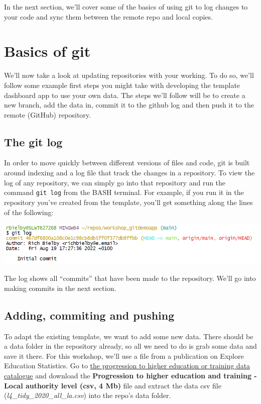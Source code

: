 \documentclass[
  12pt,
]{article}
\begin{document}
In the next section, we'll cover some of the basics of using git to log
changes to your code and sync them between the remote repo and local
copies.

\newpage

\hypertarget{basics-of-git}{%
\section{Basics of git}\label{basics-of-git}}

We'll now take a look at updating repositories with your working. To do
so, we'll follow some example first steps you might take with developing
the template dashboard app to use your own data. The steps we'll follow
will be to create a new branch, add the data in, commit it to the github
log and then push it to the remote (GitHub) repository.

\hypertarget{the-git-log}{%
\subsection{The git log}\label{the-git-log}}

In order to move quickly between different versions of files and code,
git is built around indexing and a log file that track the changes in a
repository. To view the log of any repository, we can simply go into
that repository and run the command \texttt{git\ log} from the BASH
terminal. For example, if you run it in the repository you've created
from the template, you'll get something along the lines of the
following:

\begin{center}\includegraphics[width=0.8\linewidth]{images/gitdemo/gitdemo-gitlog-1} \end{center}

The log shows all ``commits'' that have been made to the repository.
We'll go into making commits in the next section.

\hypertarget{adding-commiting-and-pushing}{%
\subsection{Adding, commiting and
pushing}\label{adding-commiting-and-pushing}}

To adapt the existing template, we want to add some new data. There
should be a data folder in the repository already, so all we need to do
is grab some data and save it there. For this workshop, we'll use a file
from a publication on Explore Education Statistics. Go to
\href{https://explore-education-statistics.service.gov.uk/data-catalogue/progression-to-higher-education-or-training/2019-20}{the
progression to higher education or training data catalogue} and download
the \textbf{Progression to higher education and training - Local
authority level (csv, 4 Mb)} file and extract the data csv file
(\emph{l4\_tidy\_2020\_all\_la.csv}) into the repo's data folder.
\end{document}
